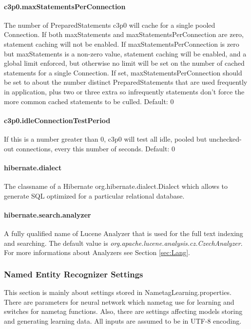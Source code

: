 \paragraph{c3p0.maxStatementsPerConnection}
The number of PreparedStatements c3p0 will cache for a single pooled Connection.
If both maxStatements and maxStatementsPerConnection are zero, statement caching
will not be enabled. If maxStatementsPerConnection is zero but maxStatements is
a non-zero value, statement caching will be enabled, and a global limit enforced,
but otherwise no limit will be set on the number of cached statements for a single
Connection. If set, maxStatementsPerConnection should be set to about the number
distinct PreparedStatements that are used frequently in application, plus
two or three extra so infrequently statements don't force the more common cached
statements to be culled.
Default: 0

\paragraph{c3p0.idleConnectionTestPeriod}
If this is a number greater than 0, c3p0 will test all idle, pooled but unchecked-out
connections, every this number of seconds.
Default: 0

\paragraph{hibernate.dialect}
The classname of a Hibernate org.hibernate.dialect.Dialect which allows to generate
SQL optimized for a particular relational database.

\paragraph{hibernate.search.analyzer}
A fully qualified name of Lucene Analyzer that is used for the full text indexing
and searching. The default value is \emph{org.\-apache.\-lucene.\-analysis.\-cz.\-CzechAnalyzer}.
For more informations about Analyzers see Section \ref{sec:Lang}.

\subsubsection{Named Entity Recognizer Settings}
\label{sssec:NametagSettings}
This section is mainly about settings stored in NametagLearning.properties. There
are parameters for neural network which nametag use for learning and switches for
nametag functions. Also, there are settings affecting models storing and
generating learning data. All inputs are assumed to be in UTF-8 encoding.

